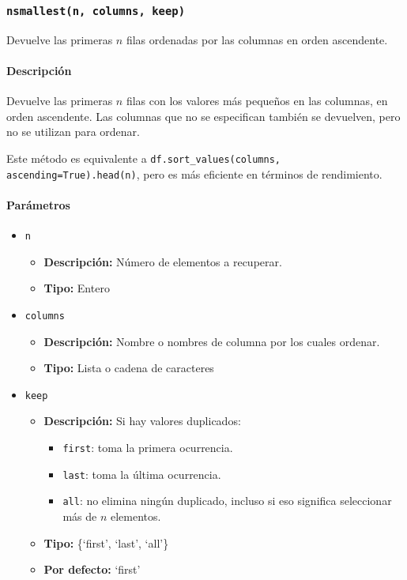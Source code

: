         \subsubsection{\texttt{nsmallest(n, columns, keep)}} Devuelve las primeras \( n \) filas ordenadas por las columnas en orden ascendente.

        \paragraph{\textbf{Descripción}}
        Devuelve las primeras \( n \) filas con los valores más pequeños en las columnas, en orden ascendente. Las columnas que no se especifican también se devuelven, pero no se utilizan para ordenar.

        Este método es equivalente a \texttt{df.sort\_values(columns, ascending=True).head(n)}, pero es más eficiente en términos de rendimiento.

        \paragraph{\textbf{Parámetros}}
        \begin{itemize}
            \item \texttt{n}
                \begin{itemize}
                    \item \textbf{Descripción:} Número de elementos a recuperar.
                    \item \textbf{Tipo:} Entero
                \end{itemize}
            \item \texttt{columns}
                \begin{itemize}
                    \item \textbf{Descripción:} Nombre o nombres de columna por los cuales ordenar.
                    \item \textbf{Tipo:} Lista o cadena de caracteres
                \end{itemize}
            \item \texttt{keep}
                \begin{itemize}
                    \item \textbf{Descripción:} Si hay valores duplicados:
                            \begin{itemize}
                                \item \texttt{first}: toma la primera ocurrencia.
                                \item \texttt{last}: toma la última ocurrencia.
                                \item \texttt{all}: no elimina ningún duplicado, incluso si eso significa seleccionar más de \( n \) elementos.
                            \end{itemize}
                    \item \textbf{Tipo:} \{`first', `last', `all'\}
                    \item \textbf{Por defecto:} `first'
                \end{itemize}
        \end{itemize}

